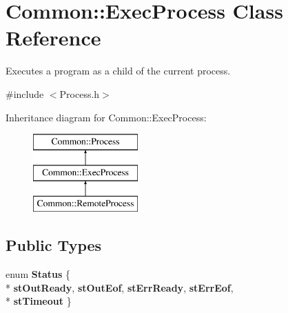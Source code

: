\hypertarget{class_common_1_1_exec_process}{\section{Common\-:\-:Exec\-Process Class Reference}
\label{class_common_1_1_exec_process}
}


Executes a program as a child of the current process.  




{\ttfamily \#include $<$Process.\-h$>$}

Inheritance diagram for Common\-:\-:Exec\-Process\-:\begin{figure}[H]
\begin{center}
\leavevmode
\includegraphics[height=3.000000cm]{class_common_1_1_exec_process}
\end{center}
\end{figure}
\subsection*{Public Types}
\begin{DoxyCompactItemize}
\item 
enum {\bfseries Status} \{ \\*
{\bfseries st\-Out\-Ready}, 
{\bfseries st\-Out\-Eof}, 
{\bfseries st\-Err\-Ready}, 
{\bfseries st\-Err\-Eof}, 
\\*
{\bfseries st\-Timeout}
 \}
\end{DoxyCompactItemize}
